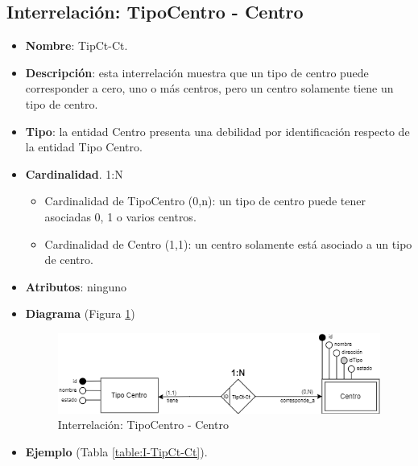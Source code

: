 \subsection{Interrelación: TipoCentro - Centro}
\begin{itemize}
    \item \textbf{Nombre}: TipCt-Ct.
    \item \textbf{Descripción}: esta interrelación muestra que un tipo de centro puede corresponder a cero, uno o más centros, pero un centro solamente tiene un tipo de centro.
    \item \textbf{Tipo}: la entidad Centro presenta una debilidad por identificación respecto de la entidad Tipo Centro.
    \item \textbf{Cardinalidad}. 1:N
    \begin{itemize}
        \item Cardinalidad de TipoCentro (0,n): un tipo de centro puede tener asociadas 0, 1 o varios centros.
        \item Cardinalidad de Centro (1,1): un centro solamente está asociado a un tipo de centro.
    \end{itemize}
    \item \textbf{Atributos}: ninguno
    \item \textbf{Diagrama} (Figura \ref{fig:I-TipCt-Ct}) 
    \begin{figure}[H]
        \centering
        \includegraphics[scale=0.7]{img/diagramas/EER/I-TipCt-Ct.png}
        \caption{Interrelación: TipoCentro - Centro}
        \label{fig:I-TipCt-Ct}
    \end{figure}
    
    \item \textbf{Ejemplo} (Tabla \ref{table:I-TipCt-Ct}).


\end{itemize}
